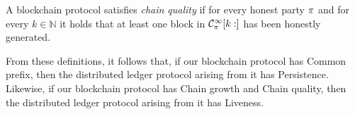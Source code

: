 \begin{definition}
  A blockchain protocol satisfies \emph{chain quality} if for every honest party
  $\pi$ and for every $k \in \mathbb{N}$ it holds that at least one block in
  $\mathcal{C}^\infty_\pi[k:]$ has been honestly generated.
\end{definition}

From these definitions, it follows that, if our blockchain protocol has Common
prefix, then the distributed ledger protocol arising from it has Persistence.
Likewise, if our blockchain protocol has Chain growth and Chain quality, then
the distributed ledger protocol arising from it has Liveness.
